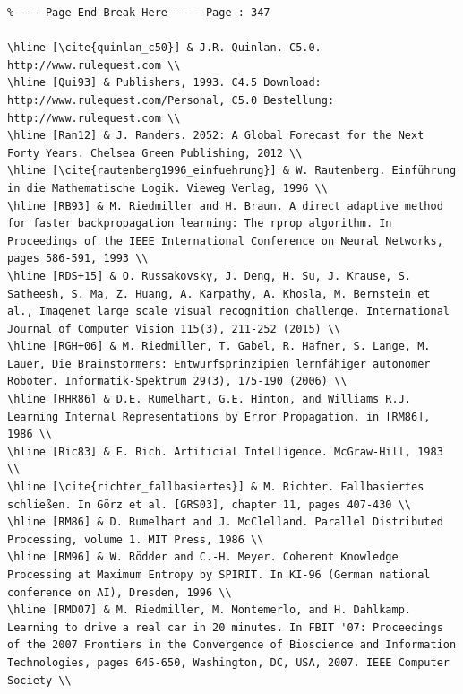 \documentclass[10pt]{article}
\begin{document}
\begin{verbatim}
%---- Page End Break Here ---- Page : 347

\hline [\cite{quinlan_c50}] & J.R. Quinlan. C5.0. http://www.rulequest.com \\
\hline [Qui93] & Publishers, 1993. C4.5 Download: http://www.rulequest.com/Personal, C5.0 Bestellung: http://www.rulequest.com \\
\hline [Ran12] & J. Randers. 2052: A Global Forecast for the Next Forty Years. Chelsea Green Publishing, 2012 \\
\hline [\cite{rautenberg1996_einfuehrung}] & W. Rautenberg. Einführung in die Mathematische Logik. Vieweg Verlag, 1996 \\
\hline [RB93] & M. Riedmiller and H. Braun. A direct adaptive method for faster backpropagation learning: The rprop algorithm. In Proceedings of the IEEE International Conference on Neural Networks, pages 586-591, 1993 \\
\hline [RDS+15] & O. Russakovsky, J. Deng, H. Su, J. Krause, S. Satheesh, S. Ma, Z. Huang, A. Karpathy, A. Khosla, M. Bernstein et al., Imagenet large scale visual recognition challenge. International Journal of Computer Vision 115(3), 211-252 (2015) \\
\hline [RGH+06] & M. Riedmiller, T. Gabel, R. Hafner, S. Lange, M. Lauer, Die Brainstormers: Entwurfsprinzipien lernfähiger autonomer Roboter. Informatik-Spektrum 29(3), 175-190 (2006) \\
\hline [RHR86] & D.E. Rumelhart, G.E. Hinton, and Williams R.J. Learning Internal Representations by Error Propagation. in [RM86], 1986 \\
\hline [Ric83] & E. Rich. Artificial Intelligence. McGraw-Hill, 1983 \\
\hline [\cite{richter_fallbasiertes}] & M. Richter. Fallbasiertes schließen. In Görz et al. [GRS03], chapter 11, pages 407-430 \\
\hline [RM86] & D. Rumelhart and J. McClelland. Parallel Distributed Processing, volume 1. MIT Press, 1986 \\
\hline [RM96] & W. Rödder and C.-H. Meyer. Coherent Knowledge Processing at Maximum Entropy by SPIRIT. In KI-96 (German national conference on AI), Dresden, 1996 \\
\hline [RMD07] & M. Riedmiller, M. Montemerlo, and H. Dahlkamp. Learning to drive a real car in 20 minutes. In FBIT '07: Proceedings of the 2007 Frontiers in the Convergence of Bioscience and Information Technologies, pages 645-650, Washington, DC, USA, 2007. IEEE Computer Society \\

\end{verbatim}
\end{document}

